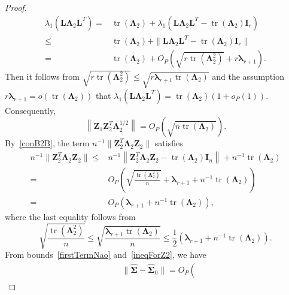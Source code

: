 \documentclass[12pt]{article} %
\DeclareMathOperator{\mytr}{tr}
\newcommand{\bZ}{\mathbf{Z}}
\newcommand{\bI}{\mathbf{I}}
\newcommand{\bL}{\mathbf{L}}
\newcommand{\bfsym}[1]{\ensuremath{\boldsymbol{#1}}}
\def\blambda {\bfsym {\lambda}}
\def\bLambda {\bfsym {\Lambda}}
\def\bSigma {\bfsym {\Sigma}}
\theoremstyle{definition}
\begin{document}
\begin{appendices}
\begin{proof}
\begin{equation*}
    \begin{split}
        \lambda_1\left( \bL \bLambda_2 \bL^T \right) 
        =&\mytr(\bLambda_2)+
        \lambda_1\left( \bL \bLambda_2 \bL^T - 
        \mytr(\bLambda_2) \bI_r
        \right) 
        \\
        \leq&
        \mytr(\bLambda_2)+
        \| \bL \bLambda_2 \bL^T - 
        \mytr(\bLambda_2) \bI_r
        \|
        \\
        =&
        \mytr(\bLambda_2)+ O_P\left(
            \sqrt{r\mytr\left(\bLambda_2^2\right)}
            +r\blambda_{r+1}
        \right).
    \end{split}
\end{equation*}
Then it follows from $\sqrt{r\mytr\left(\bLambda_2^2\right)}\leq \sqrt{r\blambda_{r+1} \mytr(\bLambda_2)}$ and
the assumption $r\blambda_{r+1}=o(\mytr(\bLambda_2))$ that $
        \lambda_1\left( \bL \bLambda_2 \bL^T \right) 
        =\mytr(\bLambda_2)(1+o_P(1))
        $.
        Consequently,
\begin{equation}\label{firstTermNao}
\left\| \bZ_1 \bZ_2^T \bLambda_2^{1/2}\right\|
=
O_P\left(\sqrt{n\mytr(\bLambda_2)}
\right)
.
\end{equation}
By~\eqref{conB2B}, the term $
n^{-1}\|\bZ_2^T \bLambda_2 \bZ_2\|
$ satisfies
\begin{equation}\label{ineqForZ2}
    \begin{split}
n^{-1}\|\bZ_2^T \bLambda_2 \bZ_2\|
 \leq& 
     n^{-1}\left\| \bZ_2^T \bLambda_2\bZ_2-\mytr(\bLambda_2)\bI_n\right\|
     +n^{-1}
     \mytr(\bLambda_2)
     \\
     =&O_P\left( 
\sqrt{\frac{\mytr\left(\bLambda_2^2\right)}{n}}+\blambda_{r+1}
     +
     n^{-1}\mytr(\bLambda_2)
 \right)
 \\
     =&O_P\left( 
\blambda_{r+1}
     +
     n^{-1}\mytr(\bLambda_2)
 \right)
 ,
    \end{split}
\end{equation}
where the last equality follows from
\begin{equation*}
    \sqrt{\frac{\mytr\left(\bLambda_2^2\right)}{n}}
    \leq
    \sqrt{\frac{\blambda_{r+1}\mytr\left(\bLambda_2\right)}{n}}
    \leq
    \frac{1}{2}\left(\blambda_{r+1}+n^{-1}\mytr\left(\bLambda_2\right)\right).
\end{equation*}
From bounds~\eqref{firstTermNao} and~\eqref{ineqForZ2}, we have
\begin{equation*}
    \begin{split}
    &\|\hat{\bSigma}-\hat{\bSigma}_0\|
    =O_P\left(

\end{split}
\end{equation*}
\end{proof}
\end{appendices}
\end{document}
